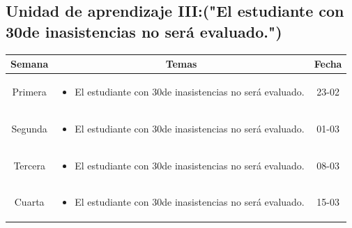 \documentclass[a4paper]{article}
\begin{document}
\subsection{Unidad de aprendizaje III:("El estudiante con 30de inasistencias no será evaluado.")}
\begin{table}[ht]
\centering
\begin{tabular}{|c|c|c|}
\hline
\textbf{Semana} & \textbf{Temas} & \textbf{Fecha} \\ 
\hline
Primera 
& \begin{minipage}[t]{10cm}
\begin{itemize}
\item El estudiante con 30de inasistencias no será evaluado.
\end{itemize}
\end{minipage} & 23-02\\ 
\hline 
Segunda 
& \begin{minipage}[t]{10cm}
\begin{itemize}
\item El estudiante con 30de inasistencias no será evaluado.
\end{itemize}
\end{minipage} & 01-03\\ 
\hline 
Tercera 
& \begin{minipage}[t]{10cm}
\begin{itemize}
\item El estudiante con 30de inasistencias no será evaluado.
\end{itemize}
\end{minipage} & 08-03 \\ 
\hline 
Cuarta 
& \begin{minipage}[t]{10cm}
\begin{itemize}
\item El estudiante con 30de inasistencias no será evaluado.
\end{itemize}
\end{minipage} & 15-03 \\ 
\hline 
\end{tabular}
\end{table}
\newpage
\end{document}

